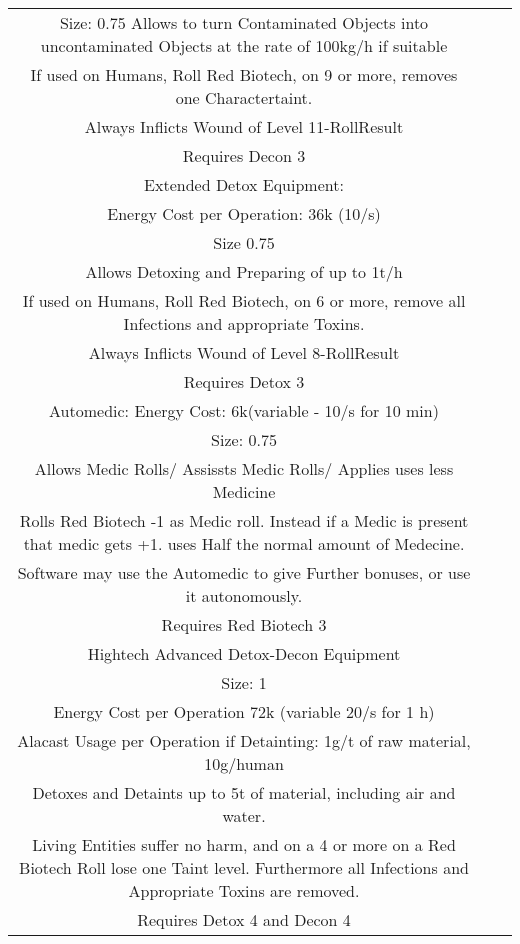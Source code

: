 \documentclass{article}
\begin{document}
\begin{tabular}{c|c|c}
    Size: 0.75
    Allows to turn Contaminated Objects into uncontaminated Objects at the rate of 100kg/h if suitable\\
    If used on Humans, Roll Red Biotech, on 9 or more, removes one Charactertaint.\\
    Always Inflicts Wound of Level 11-RollResult\\
    Requires Decon 3\\
    \newline
    Extended Detox Equipment:\\
    Energy Cost per Operation: 36k (10/s)\\
    Size 0.75\\
    Allows Detoxing and Preparing of up to 1t/h\\
    If used on Humans, Roll Red Biotech, on 6 or more, remove all Infections and appropriate Toxins.\\
    Always Inflicts Wound of Level 8-RollResult\\
    Requires Detox 3\\
    \newline
    Automedic:
    Energy Cost: 6k(variable - 10/s for 10 min)\\
    Size: 0.75\\
    Allows Medic Rolls/ Assissts Medic Rolls/ Applies uses less Medicine\\
    Rolls Red Biotech -1 as Medic roll. Instead if a Medic is present that medic gets +1. uses Half the normal amount of Medecine.\\
    Software may use the Automedic to give Further bonuses, or use it autonomously.\\
    Requires Red Biotech 3\\
    \newline
    Hightech\newline
    Advanced Detox-Decon Equipment \\
    Size: 1\\
    Energy Cost per Operation 72k (variable 20/s for 1 h)\\
    Alacast Usage per Operation if Detainting: 1g/t of raw material, 10g/human\\
    Detoxes and Detaints up to 5t of material, including air and water.\\
    Living Entities suffer no harm, and on a 4 or more on a Red Biotech Roll lose one Taint level.
    Furthermore all Infections and Appropriate Toxins are removed.\\
    Requires Detox 4 and Decon 4\\

\end{tabular}
\end{document}

